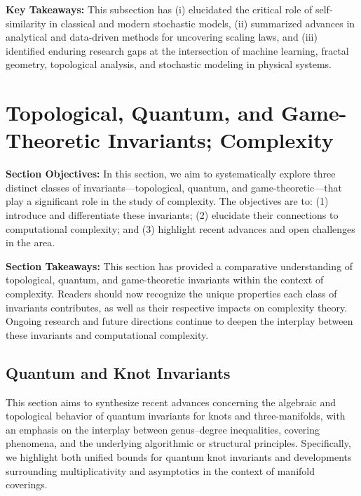 \documentclass[sigconf]{acmart}
\begin{document}
\textbf{Key Takeaways:} This subsection has (i) elucidated the critical role of self-similarity in classical and modern stochastic models, (ii) summarized advances in analytical and data-driven methods for uncovering scaling laws, and (iii) identified enduring research gaps at the intersection of machine learning, fractal geometry, topological analysis, and stochastic modeling in physical systems.

\section{Topological, Quantum, and Game-Theoretic Invariants; Complexity}

\textbf{Section Objectives:} In this section, we aim to systematically explore three distinct classes of invariants—topological, quantum, and game-theoretic—that play a significant role in the study of complexity. The objectives are to: (1) introduce and differentiate these invariants; (2) elucidate their connections to computational complexity; and (3) highlight recent advances and open challenges in the area.


\textbf{Section Takeaways:} This section has provided a comparative understanding of topological, quantum, and game-theoretic invariants within the context of complexity. Readers should now recognize the unique properties each class of invariants contributes, as well as their respective impacts on complexity theory. Ongoing research and future directions continue to deepen the interplay between these invariants and computational complexity.

\subsection{Quantum and Knot Invariants}

This section aims to synthesize recent advances concerning the algebraic and topological behavior of quantum invariants for knots and three-manifolds, with an emphasis on the interplay between genus–degree inequalities, covering phenomena, and the underlying algorithmic or structural principles. Specifically, we highlight both unified bounds for quantum knot invariants and developments surrounding multiplicativity and asymptotics in the context of manifold coverings.
\end{document}
